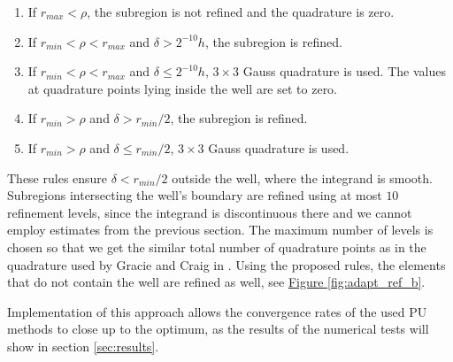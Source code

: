 \documentclass{elsarticle}
\newcommand{\fig}[1]{\hyperref[#1]{Figure \ref{#1}}}
\newcommand{\notePE}[1]{{\color{Orange} \textbf{PE: } \textit{#1}}}
\begin{document}

\begin{enumerate}
 \item If $r_{max} < \rho$, the subregion is not refined and the quadrature is zero.
 \item If $r_{min} < \rho < r_{max}$ and $\delta > 2^{-10}h$, the subregion is refined.
 \item If $r_{min} < \rho < r_{max}$ and $\delta \le 2^{-10}h$, $3\times3$ Gauss quadrature is used.
 The values at quadrature points lying inside the well are set to zero.
 \item If $r_{min} > \rho$ and $\delta > r_{min} / 2$, the subregion is refined.
 \item If $r_{min} > \rho$ and $\delta \le r_{min} / 2$, $3\times3$ Gauss quadrature is used.
\end{enumerate}


These rules ensure $\delta < r_{min}/2$ outside the well, where the integrand is smooth. Subregions intersecting 
the well's boundary are refined using at most $10$ refinement levels, since the integrand is discontinuous there and we cannot employ 
estimates from the previous section. The maximum number of levels is chosen so that we get the similar total number of quadrature points 
as in the quadrature used by Gracie and Craig in \cite{gracie_modelling_2010}. Using the proposed rules, the elements that do not contain the well are refined as well,
see \fig{fig:adapt_ref_b}. 

Implementation of this approach allows the convergence rates of the used PU methods to close up to the optimum,
as the results of the numerical tests will show in section \ref{sec:results}.
\end{document}

